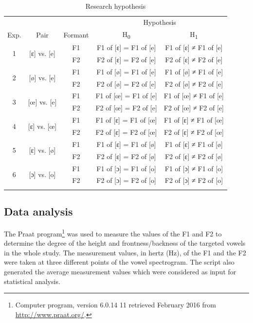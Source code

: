 \documentclass[output=paper]{langscibook}
\begin{document}
\begin{table}
    \begin{tabular}{ccccc}
    \lsptoprule
         &  &  & \multicolumn{2}{c}{Hypothesis} \\\cmidrule(lr){4-5}
       Exp.  & Pair & Formant & H\textsubscript{0} & H\textsubscript{1} \\
       \midrule
       \multirow{2}{*}{1} & \multirow{2}{*}{[ɛ] vs. [e]} & F1 &  F1 of [ɛ] = F1 of [e] &  F1 of [ɛ] ≠ F1 of [e] \\
       & & F2 &  F2 of [ɛ] = F2 of [e] & 	 F2 of [ɛ] ≠ F2 of [e]\\
       \midrule

       \multirow{2}{*}{2} & \multirow{2}{*}{[ø] vs. [e]} & F1 & 	 F1 of [ø] = F1 of [e] & 	 F1 of [ø] ≠ F1 of [e]\\
         & & F2	&  F2 of [ø] = F2 of [e] & 	 F2 of [ø] ≠ F2 of [e]\\
         \midrule

     \multirow{2}{*}{3} & \multirow{2}{*}{[œ] vs. [e]} & F1	&  F1 of [œ] = F1 of [e] & 	F1 of [œ] ≠ F1 of [e] \\
       & & F2 & 	 F2 of [œ] = F2 of [e] & 	 F2 of [œ] ≠ F2 of [e] \\
       \midrule

     \multirow{2}{*}{4} & \multirow{2}{*}{[ɛ] vs. [œ]} & F1	&  F1 of [ɛ] = F1 of [œ] & 	 F1 of [ɛ] ≠ F1 of [œ] \\
     & & F2 & 	F2 of [ɛ] = F2 of [œ] & 	 F2 of [ɛ] ≠ F2 of [œ] \\
     \midrule

     \multirow{2}{*}{5} & \multirow{2}{*}{[ɛ] vs. [ø]} & F1	&  F1 of [ɛ] = F1 of [ø] & 	 F1 of [ɛ] ≠ F1 of [ø] \\
     & & F2	&  F2 of [ɛ] = F2 of [ø]	& F2 of [ɛ] ≠ F2 of [ø] \\
     \midrule

     \multirow{2}{*}{6} & \multirow{2}{*}{[ɔ] vs. [o]} & F1	& F1 of [ɔ] = F1 of [o]	&  F1 of [ɔ] ≠ F1 of [o] \\
                                                    & & F2	& F2 of [ɔ] = F2 of [o]	&  F2 of [ɔ] ≠ F2 of [o] \\
     \lspbottomrule
    \end{tabular}
    \caption{Research hypothesis\label{tab:hypothesis}}
\end{table}

\subsection{Data analysis}
The Praat program\footnote{Computer program, version 6.0.14 11 retrieved February 2016 from \url{http://www.praat.org/}.} was used to measure the values of the F1 and F2 to determine the degree of the height and frontness\slash backness of the targeted vowels in the whole study. The measurement values, in hertz (Hz), of the F1 and the F2 were taken at three different points of the vowel spectrogram. The script also generated the average measurement values which were considered as input for statistical analysis.
\end{document}
